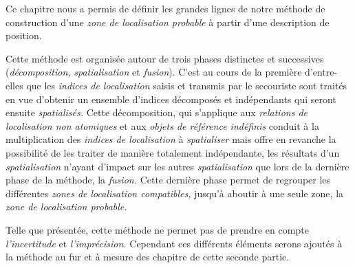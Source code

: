 Ce chapitre nous a permis de définir les grandes lignes de notre
méthode de construction d'une \emph{zone de localisation probable} à
partir d'une description de position.

Cette méthode est organisée autour de trois phases distinctes et
successives (\emph{décomposition,} \emph{spatialisation} et
\emph{fusion}). C'est au cours de la première d'entre-elles que les
\emph{indices de localisation} saisis et transmis par le secouriste
sont traités en vue d'obtenir un ensemble d'indices décomposés et
indépendants qui seront ensuite \emph{spatialisés.} Cette
décomposition, qui s'applique aux \emph{relations de localisation non
  atomiques} et aux \emph{objets de référence indéfinis} conduit à la
multiplication des \emph{indices de localisation} à \emph{spatialiser}
mais offre en revanche la possibilité de les traiter de manière
totalement indépendante, les résultats d'un \emph{spatialisation}
n'ayant d'impact sur les autres \emph{spatialisation} que lors de la
dernière phase de la méthode, la \emph{fusion.}  Cette dernière phase
permet de regrouper les différentes \emph{zones de localisation
  compatibles,} jusqu'à aboutir à une seule zone, la \emph{zone de
  localisation probable.}

Telle que présentée, cette méthode ne permet pas de prendre en compte
\emph{l'incertitude} et \emph{l'imprécision.} Cependant ces différents
éléments serons ajoutés à la méthode au fur et à mesure des chapitre
de cette seconde partie.
